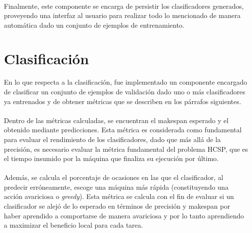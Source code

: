 \paragraph{} Finalmente, este componente se encarga de persistir los clasificadores generados, proveyendo una interfaz al usuario para realizar todo lo mencionado de manera automática dado un conjunto de ejemplos de entrenamiento.

\section{Clasificación}

\paragraph{} En lo que respecta a la clasificación, fue implementado un componente encargado de clasificar un conjunto de ejemplos de validación dado uno o más clasificadores ya entrenados y de obtener métricas que se describen en los párrafos siguientes.

\paragraph{} Dentro de las métricas calculadas, se encuentran el makespan esperado y el obtenido mediante predicciones. Esta métrica es considerada como fundamental para evaluar el rendimiento de los clasificadores, dado que más allá de la precisión, es necesario evaluar la métrica fundamental del problema HCSP, que es el tiempo insumido por la máquina que finaliza su ejecución por último.

\paragraph{} Además, se calcula el porcentaje de ocasiones en las que el clasificador, al predecir erróneamente, escoge una máquina más rápida (constituyendo una acción avariciosa o \textit{greedy}). Esta métrica se calcula con el fin de evaluar si un clasificador se alejó de lo esperado en términos de precisión y makespan por haber aprendido a comportarse de manera avariciosa y por lo tanto aprendiendo a maximizar el beneficio local para cada tarea.